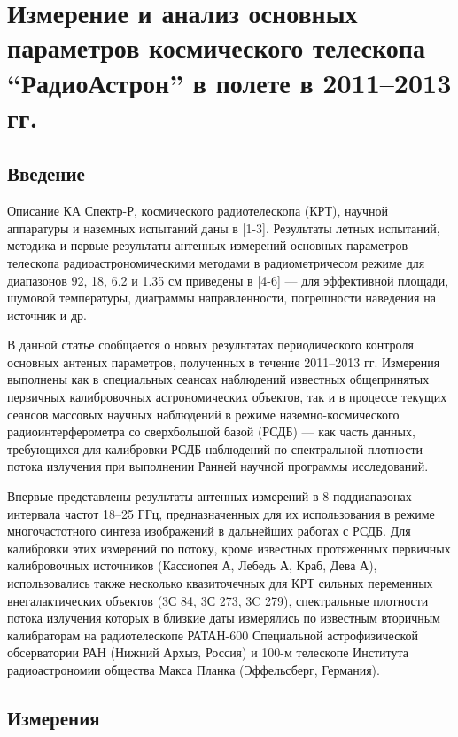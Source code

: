\section{Измерение и анализ основных параметров космического телескопа ``РадиоАстрон'' в полете в
2011--2013 гг.}

\subsection{Введение}

Описание КА Спектр-Р, космического радиотелескопа (КРТ), научной аппаратуры и наземных испытаний
даны в [1-3]. Результаты
летных испытаний, методика и первые результаты антенных измерений основных
параметров телескопа радиоастрономическими методами в радиометричесом режиме
для диапазонов 92, 18, 6.2 и 1.35 см приведены в [4-6] --- для эффективной
площади, шумовой температуры, диаграммы направленности, погрешности
наведения на источник и др.

В данной статье сообщается о новых результатах периодического контроля основных
антеных параметров, полученных в течение 2011--2013 гг. Измерения выполнены  как
в специальных сеансах наблюдений известных общепринятых первичных калибровочных
астрономических объектов, так и в процессе текущих сеансов массовых научных
наблюдений в режиме наземно-космического радиоинтерферометра со сверхбольшой
базой (РСДБ) --- как часть данных, требующихся для калибровки РСДБ наблюдений по
спектральной плотности потока излучения при выполнении Ранней научной программы
исследований.

Впервые представлены результаты антенных измерений в 8 поддиапазонах интервала частот 18--25 ГГц,
предназначенных для их использования в режиме многочастотного синтеза изображений в дальнейших
работах с РСДБ. Для калибровки этих измерений по потоку, кроме известных протяженных первичных
калибровочных источников (Кассиопея А, Лебедь А, Краб, Дева А), использовались также несколько
квазиточечных для КРТ сильных переменных внегалактических объектов (3С 84, 3С 273, 3C 279),
спектральные плотности потока излучения которых в близкие даты измерялись по известным вторичным
калибраторам на радиотелескопе РАТАН-600 Специальной астрофизической обсерватории РАН (Нижний Архыз,
Россия) и 100-м телескопе Института радиоастрономии общества Макса Планка (Эффельсберг, Германия).

\subsection{Измерения}

